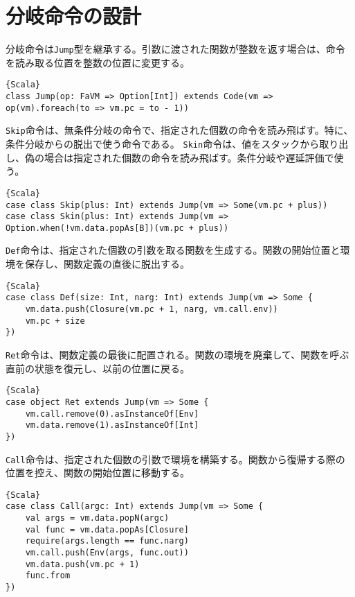 \documentclass[10pt,a4paper]{book}
\begin{document}
\section{分岐命令の設計\label{sect:jump}}

分岐命令は\texttt{Jump}型を継承する。引数に渡された関数が整数を返す場合は、命令を読み取る位置を整数の位置に変更する。

\begin{Verbatim}{Scala}
class Jump(op: FaVM => Option[Int]) extends Code(vm => op(vm).foreach(to => vm.pc = to - 1))
\end{Verbatim}

\texttt{Skip}命令は、無条件分岐の命令で、指定された個数の命令を読み飛ばす。特に、条件分岐からの脱出で使う命令である。
\texttt{Skin}命令は、値をスタックから取り出し、偽の場合は指定された個数の命令を読み飛ばす。条件分岐や遅延評価で使う。

\begin{Verbatim}{Scala}
case class Skip(plus: Int) extends Jump(vm => Some(vm.pc + plus))
case class Skin(plus: Int) extends Jump(vm => Option.when(!vm.data.popAs[B])(vm.pc + plus))
\end{Verbatim}

\texttt{Def}命令は、指定された個数の引数を取る関数を生成する。関数の開始位置と環境を保存し、関数定義の直後に脱出する。

\begin{Verbatim}{Scala}
case class Def(size: Int, narg: Int) extends Jump(vm => Some {
	vm.data.push(Closure(vm.pc + 1, narg, vm.call.env))
	vm.pc + size
})
\end{Verbatim}

\texttt{Ret}命令は、関数定義の最後に配置される。関数の環境を廃棄して、関数を呼ぶ直前の状態を復元し、以前の位置に戻る。

\begin{Verbatim}{Scala}
case object Ret extends Jump(vm => Some {
	vm.call.remove(0).asInstanceOf[Env]
	vm.data.remove(1).asInstanceOf[Int]
})
\end{Verbatim}

\texttt{Call}命令は、指定された個数の引数で環境を構築する。関数から復帰する際の位置を控え、関数の開始位置に移動する。

\begin{Verbatim}{Scala}
case class Call(argc: Int) extends Jump(vm => Some {
	val args = vm.data.popN(argc)
	val func = vm.data.popAs[Closure]
	require(args.length == func.narg)
	vm.call.push(Env(args, func.out))
	vm.data.push(vm.pc + 1)
	func.from
})
\end{Verbatim}
\end{document}
